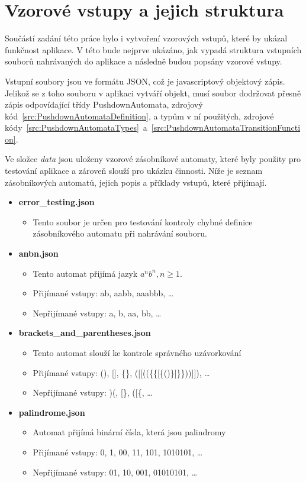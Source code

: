 \chapter{Vzorové vstupy a jejich struktura}\label{chap:Inputs}

Součástí zadání této práce bylo i vytvoření vzorových vstupů, které by ukázal funkčnost aplikace. V této bude nejprve ukázáno, jak vypadá struktura vstupních souborů nahrávaných do aplikace a následně budou popsány vzorové vstupy.

Vstupní soubory jsou ve formátu JSON, což je javascriptový objektový zápis. Jelikož se z toho souboru v aplikaci vytváří objekt, musí soubor dodržovat přesně zápis odpovídající třídy PushdownAutomata, zdrojový kód~\ref{src:PushdownAutomataDefinition}, a typům v ní použitých, zdrojové kódy~\ref{src:PushdownAutomataTypes}~a~\ref{src:PushdownAutomataTransitionFunction}.

Ve složce \textit{data} jsou uloženy vzorové zásobníkové automaty, které byly použity pro testování aplikace a zároveň slouží pro ukázku činnosti. Níže je seznam zásobníkových automatů, jejich popis a příklady vstupů, které přijímají.

\begin{itemize}
    \item \textbf{error\_testing.json}
        \begin{itemize}
            \item Tento soubor je určen pro testování kontroly chybné definice zásobníkového automatu při nahrávání souboru.
        \end{itemize}
    \item \textbf{anbn.json}
        \begin{itemize}
            \item Tento automat přijímá jazyk $a^nb^n, n \ge 1$.
            \item Přijímané vstupy: ab, aabb, aaabbb, \ldots
            \item Nepřijímané vstupy: a, b, aa, bb, \ldots
        \end{itemize}
    \item \textbf{brackets\_and\_parentheses.json}
        \begin{itemize}
            \item Tento automat slouží ke kontrole správného uzávorkování
            \item Přijímané vstupy: (), [], \{\}, ([[((\{\{[\{()\}]\}\}))]]), \ldots
            \item Nepřijímané vstupy: )(, [\}, ([\{, \ldots
        \end{itemize}
    \item \textbf{palindrome.json}
        \begin{itemize}
            \item Automat přijímá binární čísla, která jsou palindromy
            \item Přijímané vstupy: 0, 1, 00, 11, 101, 1010101, \ldots
            \item Nepřijímané vstupy: 01, 10, 001, 01010101, \ldots
        \end{itemize}
\end{itemize}

\endinput